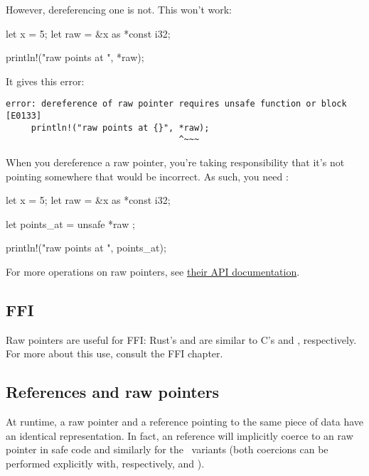 However, dereferencing one is not. This won't work:

\begin{rustc}
let x = 5;
let raw = &x as *const i32;

println!("raw points at {}", *raw);
\end{rustc}

It gives this error:

\begin{verbatim}
error: dereference of raw pointer requires unsafe function or block [E0133]
     println!("raw points at {}", *raw);
                                  ^~~~
\end{verbatim}

When you dereference a raw pointer, you're taking responsibility that it's not pointing somewhere that would be incorrect. 
As such, you need :

\begin{rustc}
let x = 5;
let raw = &x as *const i32;

let points_at = unsafe { *raw };

println!("raw points at {}", points_at);
\end{rustc}

For more operations on raw pointers, see \href{https://doc.rust-lang.org/std/primitive.pointer.html}{their API documentation}.

\subsection*{FFI}

Raw pointers are useful for FFI: Rust's  and  are similar to C's  and , respectively. 
For more about this use, consult the FFI chapter.

\subsection*{References and raw pointers}

At runtime, a raw pointer \code{*} and a reference pointing to the same piece of data have an identical representation. In fact, an 
 reference will implicitly coerce to an  raw pointer in safe code and similarly for the \mut\ variants (both 
coercions can be performed explicitly with, respectively,  and ).

\blank

